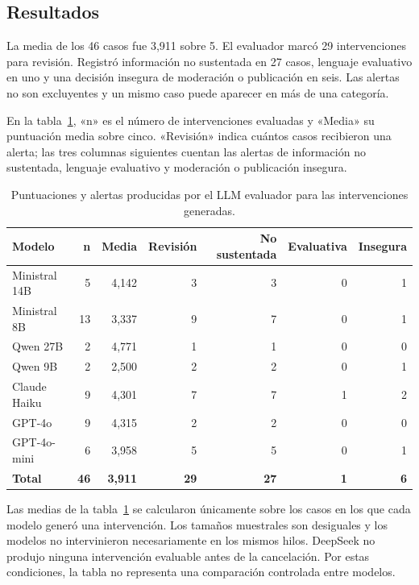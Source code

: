 \subsection{Resultados}

La media de los 46 casos fue 3,911 sobre 5. El evaluador marcó 29 intervenciones para revisión. Registró información no sustentada en 27 casos, lenguaje evaluativo en uno y una decisión insegura de moderación o publicación en seis. Las alertas no son excluyentes y un mismo caso puede aparecer en más de una categoría.

En la tabla~\ref{tab:judge-modelos}, «n» es el número de intervenciones evaluadas y «Media» su puntuación media sobre cinco. «Revisión» indica cuántos casos recibieron una alerta; las tres columnas siguientes cuentan las alertas de información no sustentada, lenguaje evaluativo y moderación o publicación insegura.

\begin{table}[htbp]
\centering
\scriptsize
\begin{tabular}{lrrrrrr}
\toprule
\textbf{Modelo} & \textbf{n} & \textbf{Media} & \textbf{Revisión} & \textbf{No sustentada} & \textbf{Evaluativa} & \textbf{Insegura} \\
\midrule
Ministral 14B & 5  & 4,142 & 3 & 3 & 0 & 1 \\
Ministral 8B  & 13 & 3,337 & 9 & 7 & 0 & 1 \\
Qwen 27B      & 2  & 4,771 & 1 & 1 & 0 & 0 \\
Qwen 9B       & 2  & 2,500 & 2 & 2 & 0 & 1 \\
Claude Haiku  & 9  & 4,301 & 7 & 7 & 1 & 2 \\
GPT-4o        & 9  & 4,315 & 2 & 2 & 0 & 0 \\
GPT-4o-mini   & 6  & 3,958 & 5 & 5 & 0 & 1 \\
\midrule
\textbf{Total} & \textbf{46} & \textbf{3,911} & \textbf{29} & \textbf{27} & \textbf{1} & \textbf{6} \\
\bottomrule
\end{tabular}
\caption{Puntuaciones y alertas producidas por el LLM evaluador para las intervenciones generadas.}
\label{tab:judge-modelos}
\end{table}

Las medias de la tabla~\ref{tab:judge-modelos} se calcularon únicamente sobre los casos en los que cada modelo generó una intervención. Los tamaños muestrales son desiguales y los modelos no intervinieron necesariamente en los mismos hilos. DeepSeek no produjo ninguna intervención evaluable antes de la cancelación. Por estas condiciones, la tabla no representa una comparación controlada entre modelos.

